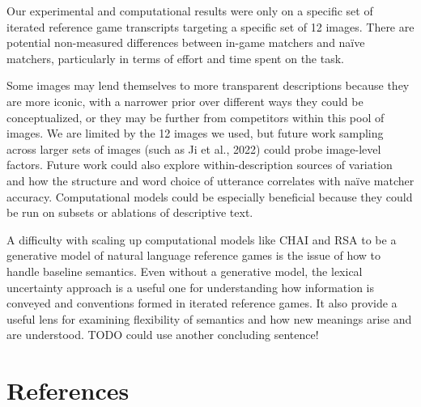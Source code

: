 \documentclass[10pt, letterpaper]{article}
\begin{document}
Our experimental and computational results were only on a specific set
of iterated reference game transcripts targeting a specific set of 12
images. There are potential non-measured differences between in-game
matchers and naïve matchers, particularly in terms of effort and time
spent on the task.

Some images may lend themselves to more transparent descriptions because
they are more iconic, with a narrower prior over different ways they
could be conceptualized, or they may be further from competitors within
this pool of images. We are limited by the 12 images we used, but future
work sampling across larger sets of images (such as Ji et al., 2022)
could probe image-level factors. Future work could also explore
within-description sources of variation and how the structure and word
choice of utterance correlates with naïve matcher accuracy.
Computational models could be especially beneficial because they could
be run on subsets or ablations of descriptive text.

A difficulty with scaling up computational models like CHAI and RSA to
be a generative model of natural language reference games is the issue
of how to handle baseline semantics. Even without a generative model,
the lexical uncertainty approach is a useful one for understanding how
information is conveyed and conventions formed in iterated reference
games. It also provide a useful lens for examining flexibility of
semantics and how new meanings arise and are understood. TODO could use
another concluding sentence!

\section{References}\label{references}

\setlength{\parindent}{-0.1in} 
\setlength{\leftskip}{0.125in}

\noindent
\end{document}
